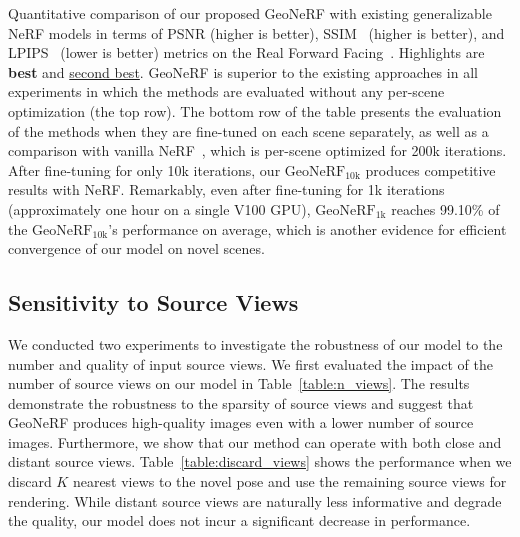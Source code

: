\begin{table}[!t]
    \caption{Quantitative comparison of our proposed GeoNeRF with existing generalizable NeRF models in terms of PSNR (higher is better), SSIM~\cite{wang2004image} (higher is better), and LPIPS~\cite{zhang2018unreasonable} (lower is better) metrics on the Real Forward Facing~\cite{mildenhall2019llff}. Highlights are \textbf{best} and \underline{second best}. GeoNeRF is superior to the existing approaches in all experiments in which the methods are evaluated without any per-scene optimization (the top row). The bottom row of the table presents the evaluation of the methods when they are fine-tuned on each scene separately, as well as a comparison with vanilla NeRF~\cite{mildenhall2020nerf}, which is per-scene optimized for 200k iterations. After fine-tuning for only 10k iterations, our $\text{GeoNeRF}_{\text{10k}}$ produces competitive results with NeRF. Remarkably, even after fine-tuning for 1k iterations (approximately one hour on a single V100 GPU), $\text{GeoNeRF}_{\text{1k}}$ reaches 99.10\% of the $\text{GeoNeRF}_{\text{10k}}$'s performance on average, which is another evidence for efficient convergence of our model on novel scenes.}
    \label{table:quantitative_llff}
\end{table}

\subsection{Sensitivity to Source Views} \label{sec:c3_sensitivity}
We conducted two experiments to investigate the robustness of our model to the number and quality of input source views. We first evaluated the impact of the number of source views on our model in Table~\ref{table:n_views}. The results demonstrate the robustness to the sparsity of source views and suggest that GeoNeRF produces high-quality images even with a lower number of source images. Furthermore, we show that our method can operate with both close and distant source views. Table~\ref{table:discard_views} shows the performance when we discard $K$ nearest views to the novel pose and use the remaining source views for rendering. While distant source views are naturally less informative and degrade the quality, our model does not incur a significant decrease in performance.


